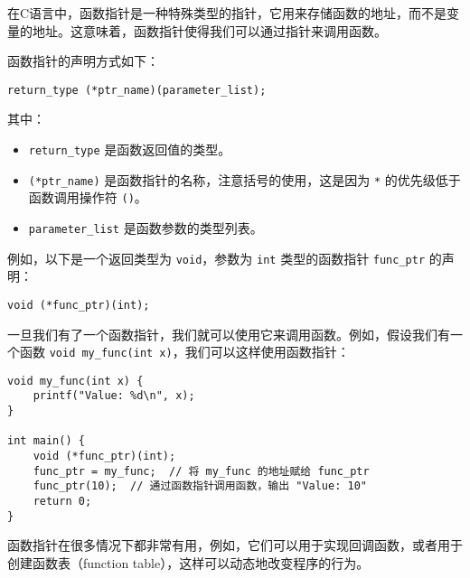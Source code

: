 \documentclass{ctexart}
\begin{document}
在C语言中，函数指针是一种特殊类型的指针，它用来存储函数的地址，而不是变量的地址。这意味着，函数指针使得我们可以通过指针来调用函数。  
  
函数指针的声明方式如下：  
  
\begin{verbatim}  
return_type (*ptr_name)(parameter_list);  
\end{verbatim}  
  
其中：  
  
\begin{itemize}  
\item \texttt{return\_type} 是函数返回值的类型。  
\item \texttt{(*ptr\_name)} 是函数指针的名称，注意括号的使用，这是因为 \texttt{*} 的优先级低于函数调用操作符 \texttt{()}。  
\item \texttt{parameter\_list} 是函数参数的类型列表。  
\end{itemize}  
  
例如，以下是一个返回类型为 \texttt{void}，参数为 \texttt{int} 类型的函数指针 \texttt{func\_ptr} 的声明：  
  
\begin{verbatim}  
void (*func_ptr)(int);  
\end{verbatim}  
  
一旦我们有了一个函数指针，我们就可以使用它来调用函数。例如，假设我们有一个函数 \texttt{void my\_func(int x)}，我们可以这样使用函数指针：  
  
\begin{verbatim}  
void my_func(int x) {  
    printf("Value: %d\n", x);  
}  
  
int main() {  
    void (*func_ptr)(int);  
    func_ptr = my_func;  // 将 my_func 的地址赋给 func_ptr  
    func_ptr(10);  // 通过函数指针调用函数，输出 "Value: 10"  
    return 0;  
}  
\end{verbatim}  
  
函数指针在很多情况下都非常有用，例如，它们可以用于实现回调函数，或者用于创建函数表（function table），这样可以动态地改变程序的行为。  
\end{document}
